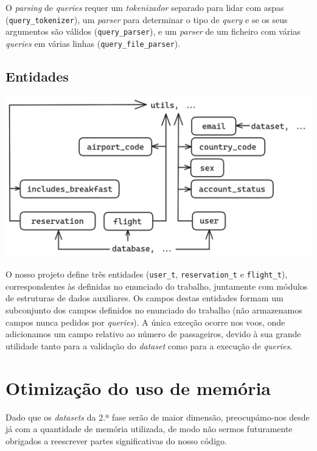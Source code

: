 \documentclass[12pt, a4paper]{article}
\begin{document}
O \emph{parsing} de \emph{queries} requer um \emph{tokenizador} separado para lidar com aspas
(\texttt{query\_tokenizer}), um \emph{parser} para determinar o tipo de \emph{query} e se os seus
argumentos são válidos (\texttt{query\_parser}), e um \emph{parser} de um ficheiro com várias
\emph{queries} em várias linhas (\texttt{query\_file\_parser}).

\subsection{Entidades}

\begin{center}
	\includegraphics[scale=0.3]{res/tipos.png}
\end{center}

O nosso projeto define três entidades (\texttt{user\_t}, \texttt{reservation\_t} e
\texttt{flight\_t}), correspondentes às definidas no enunciado do trabalho, juntamente com módulos
de estruturas de dados auxiliares. Os campos destas entidades formam um subconjunto dos campos
definidos no enunciado do trabalho (não armazenamos campos nunca pedidos por \emph{queries}). A
única exceção ocorre nos voos, onde adicionamos um campo relativo ao número de passageiros, devido
à sua grande utilidade tanto para a validação do \emph{dataset} como para a execução de
\emph{queries}.

\section{Otimização do uso de memória}

Dado que os \emph{datasets} da 2.ª fase serão de maior dimensão, preocupámo-nos desde já com a
quantidade de memória utilizada, de modo não sermos futuramente obrigados a reescrever partes
significativas do nosso código.
\end{document}
